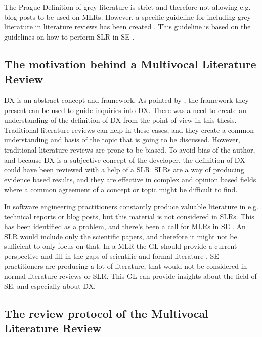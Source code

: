\documentclass[english, 12pt, a4paper, sci, utf8, a-1b, online]{aaltothesis}
\begin{document}
The Prague Definition of grey literature is strict and therefore not allowing e.g. blog posts to be used on MLRs. However, a specific guideline for including grey literature in literature reviews has been created \citep{guidelines-for-MLR}. This guideline is based on the guidelines on how to perform SLR in SE \citep{guidelines-for-SLR-in-SE}.

\subsection{The motivation behind a Multivocal Literature Review}

DX is an abstract concept and framework. As pointed by \cite{fagerholm-doctoral-thesis}, the framework they present can be used to guide inquiries into DX. There was a need to create an understanding of the definition of DX from the point of view in this thesis. Traditional literature reviews can help in these cases, and they create a common understanding and basis of the topic that is going to be discussed. However, traditional literature reviews are prone to be biased. To avoid bias of the author, and because DX is a subjective concept of the developer, the definition of DX could have been reviewed with a help of a SLR. SLRs are a way of producing evidence based results, and they are effective in complex and opinion based fields where a common agreement of a concept or topic might be difficult to find.

In software engineering practitioners constantly produce valuable literature in e.g. technical reports or blog posts, but this material is not considered in SLRs. This has been identified as a problem, and there's been a call for MLRs in SE \citep{the-need-for-MLR}. An SLR would include only the scientific papers, and therefore it might not be sufficient to only focus on that. In a MLR the GL should provide a current perspective and fill in the gaps of scientific and formal literature \citep{guidelines-for-MLR}. SE practitioners are producing a lot of literature, that would not be considered in normal literature reviews or SLR. This GL can provide insights about the field of SE, and especially about DX.


\subsection{The review protocol of the Multivocal Literature Review}
\end{document}
